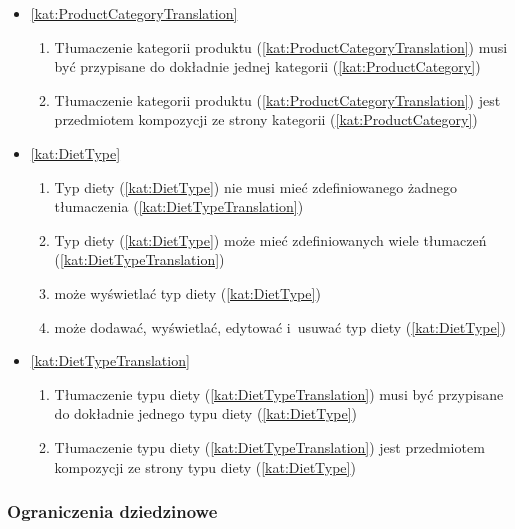 \begin{itemize}[label={\textbf{Reguły dla}}, wide, labelwidth=!, labelindent=0pt]
\begin{enumerate}[label={\textbf{REG/2/\protect\twodigits{\arabic{enumi}}}}, wide, labelwidth=!, align=left, leftmargin=3cm, resume]
    \end{enumerate}
    \item\ref{kat:ProductCategoryTranslation}\mynobreakpar
    \begin{enumerate}[label={\textbf{REG/2/\protect\twodigits{\arabic{enumi}}}}, wide, labelwidth=!, align=left, leftmargin=3cm, resume]
        \item Tłumaczenie kategorii produktu (\ref{kat:ProductCategoryTranslation}) musi być przypisane do dokładnie jednej kategorii (\ref{kat:ProductCategory})
        \item Tłumaczenie kategorii produktu (\ref{kat:ProductCategoryTranslation}) jest przedmiotem kompozycji ze strony kategorii (\ref{kat:ProductCategory})
    \end{enumerate}
    \item\ref{kat:DietType}\mynobreakpar
    \begin{enumerate}[label={\textbf{REG/2/\protect\twodigits{\arabic{enumi}}}}, wide, labelwidth=!, align=left, leftmargin=3cm, resume]
        \item Typ diety (\ref{kat:DietType}) nie musi mieć zdefiniowanego żadnego tłumaczenia (\ref{kat:DietTypeTranslation})
        \item Typ diety (\ref{kat:DietType}) może mieć zdefiniowanych wiele tłumaczeń (\ref{kat:DietTypeTranslation})
        \item {} może wyświetlać typ diety (\ref{kat:DietType})
        \item {} może dodawać, wyświetlać, edytować i~usuwać typ diety (\ref{kat:DietType})
    \end{enumerate}
    \item\ref{kat:DietTypeTranslation}\mynobreakpar
    \begin{enumerate}[label={\textbf{REG/2/\protect\twodigits{\arabic{enumi}}}}, wide, labelwidth=!, align=left, leftmargin=3cm, resume]
        \item Tłumaczenie typu diety (\ref{kat:DietTypeTranslation}) musi być przypisane do dokładnie jednego typu diety (\ref{kat:DietType})
        \item Tłumaczenie typu diety (\ref{kat:DietTypeTranslation}) jest przedmiotem kompozycji ze strony typu diety (\ref{kat:DietType})
    \end{enumerate}
\end{itemize}

\subsubsection{Ograniczenia dziedzinowe}\label{subsubsec:database:products:restrictions}

